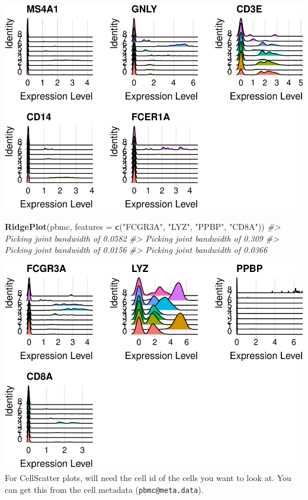 \documentclass[
]{book}
\newenvironment{Shaded}{\begin{snugshade}}{\end{snugshade}}
\newcommand{\AttributeTok}[1]{\textcolor[rgb]{0.13,0.29,0.53}{#1}}
\newcommand{\CommentTok}[1]{\textcolor[rgb]{0.56,0.35,0.01}{\textit{#1}}}
\newcommand{\FunctionTok}[1]{\textcolor[rgb]{0.13,0.29,0.53}{\textbf{#1}}}
\newcommand{\NormalTok}[1]{#1}
\newcommand{\StringTok}[1]{\textcolor[rgb]{0.31,0.60,0.02}{#1}}
\begin{document}
\includegraphics{scRNAseqInR_Doco_files/figure-latex/ridgeplots-1.pdf}

\begin{Shaded}
\begin{Highlighting}[]
\FunctionTok{RidgePlot}\NormalTok{(pbmc, }\AttributeTok{features =} \FunctionTok{c}\NormalTok{(}\StringTok{"FCGR3A"}\NormalTok{, }\StringTok{"LYZ"}\NormalTok{, }\StringTok{"PPBP"}\NormalTok{, }\StringTok{"CD8A"}\NormalTok{))}
\CommentTok{\#\textgreater{} Picking joint bandwidth of 0.0582}
\CommentTok{\#\textgreater{} Picking joint bandwidth of 0.309}
\CommentTok{\#\textgreater{} Picking joint bandwidth of 0.0156}
\CommentTok{\#\textgreater{} Picking joint bandwidth of 0.0366}
\end{Highlighting}
\end{Shaded}

\includegraphics{scRNAseqInR_Doco_files/figure-latex/ridgeplots-2.pdf}
For CellScatter plots, will need the cell id of the cells you want to look at. You can get this from the cell metadata (\texttt{pbmc@meta.data}).
\end{document}
